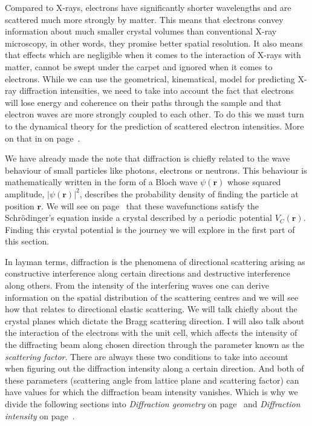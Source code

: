 Compared to X-rays, electrons have significantly shorter wavelengths and are scattered much more strongly by matter. This means that electrons convey information about much smaller crystal volumes than conventional X-ray microscopy, in other words, they promise better spatial resolution. It also means that effects which are negligible when it comes to the  interaction of X-rays with matter, cannot be swept under the carpet and ignored when it comes to electrons. While we can  use the geometrical, \ie kinematical, model for predicting X-ray diffraction intensities,  we need to take into account the fact that electrons   will lose energy and coherence on their paths through the sample and that electron waves are more strongly coupled to each other. To do this we must turn to the dynamical theory for the prediction of scattered electron intensities. More on that in on page~\pageref{sec:kinvsDyn}.

We have already made the note that diffraction is chiefly related to the wave behaviour of small particles like photons, electrons or neutrons. This behaviour is mathematically written in the form of a Bloch wave $\psi(\mathbf{r})$ whose squared amplitude, $|\psi(\mathbf{r})|^2$, describes the probability density of finding the particle at position $\mathbf{r}$. We will see on page~\pageref{sec:DHW} that these wavefunctions satisfy the Schr{\"o}dinger's equation inside a crystal described by a periodic potential $V_C(\mathbf{r})$. Finding this crystal potential is the journey we will explore in the first part of this section.

In layman terms, diffraction is the phenomena of directional scattering arising as constructive interference along certain directions and destructive interference along others. From the intensity of the interfering waves one can derive information on the spatial distribution of the scattering centres and we will see how that relates to directional elastic scattering. We will talk chiefly about the crystal planes which dictate the Bragg scattering direction.
I will also talk about the interaction of the electrons with the unit cell, which affects the intensity of the diffracting beam along chosen direction through the parameter known as the \textit{scattering factor}. There are always these two conditions to take into account when figuring out the diffraction intensity along a certain direction. And both of these parameters (scattering angle from lattice plane and scattering factor) can have values for which the diffraction beam intensity vanishes. Which is why we divide the following sections into \textit{Diffraction geometry} on page~\pageref{sec:geometry} and  \textit{Diffraction intensity} on page~\pageref{sec:intensity}.





